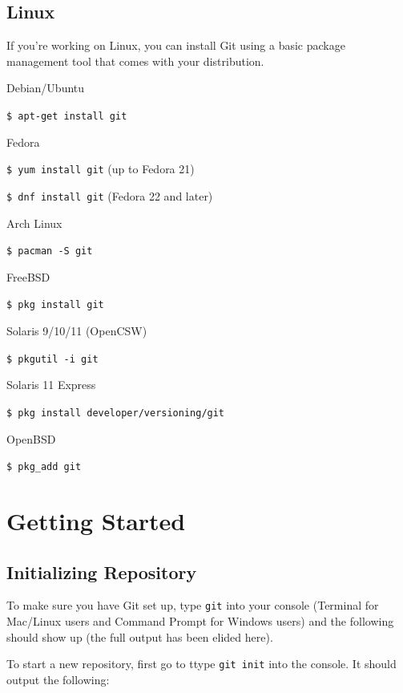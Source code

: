 \documentclass[12pt]{report}
\begin{document}
\section{Linux}

If you're working on Linux, you can install Git using a basic package management tool that comes with your distribution.

Debian/Ubuntu

\verb|$ apt-get install git|

\bigskip

Fedora

\verb|$ yum install git| (up to Fedora 21)

\verb|$ dnf install git| (Fedora 22 and later)

\bigskip

Arch Linux

\verb|$ pacman -S git|

\bigskip

FreeBSD

\verb|$ pkg install git|

\bigskip

Solaris 9/10/11 (OpenCSW)

\verb|$ pkgutil -i git|

\bigskip

Solaris 11 Express

\verb|$ pkg install developer/versioning/git|

\bigskip

OpenBSD

\verb|$ pkg_add git|


\chapter{Getting Started}
\section{Initializing Repository}

To make sure you have Git set up, type \verb|git| into your console (Terminal for Mac/Linux users and Command Prompt for Windows users) and the following should show up (the full output has been elided here).

\bigskip
\noindent
To start a new repository, first go to ttype \verb|git init| into the console. It should output the following:
\end{document}
